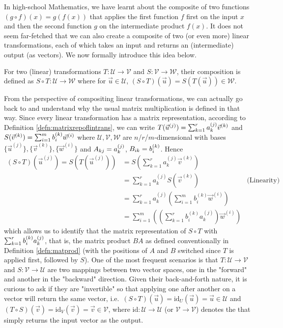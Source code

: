 In high-school Mathematics, we have learnt about the composite of two functions $(g \circ f)(x) = g(f(x))$ that applies the first function $f$ first on the input $x$ and then the second function $g$ on the intermediate product $f(x)$. It does not seem far-fetched that we can also create a composite of two (or even more) linear transformations, each of which takes an input and returns an (intermediate) output (as vectors). We now formally introduce this idea below.
\begin{defn}
For two (linear) transformations $T: \mathcal{U} \to \mathcal{V}$ and $S: \mathcal{V} \to \mathcal{W}$, their composition is defined as $S \circ T: \mathcal{U} \to \mathcal{W}$ where for $\vec{u} \in \mathcal{U}$, $(S \circ T)(\vec{u}) = S(T(\vec{u})) \in \mathcal{W}$.
\end{defn}
From the perspective of compositing linear transformations, we can actually go back to and understand why the usual matrix multiplication is defined in that way. Since every linear transformation has a matrix representation, according to Definition \ref{defn:matrixrepoflintrans}, we can write $T(\vec{u}^{(j)}) = \sum_{k=1}^{r} \smash{a_k^{(j)}}\vec{v}^{(k)}$ and $S(\vec{v}^{(k)}) = \sum_{i=1}^{m} \smash{b_i^{(k)}}\vec{w}^{(i)}$ where $\mathcal{U}, \mathcal{V}, \mathcal{W}$ are $n$/$r$/$m$-dimensional with bases $\{\vec{u}^{(j)}\}, \{\vec{v}^{(k)}\}, \{\vec{w}^{(i)}\}$ and $A_{kj} = \smash{a_k^{(j)}}$, $B_{ik} = \smash{b_i^{(k)}}$. Hence
\begin{align*}
(S \circ T)(\vec{u}^{(j)}) = S(T(\vec{u}^{(j)})) &= S(\sum_{k=1}^{r} a_k^{(j)}\vec{v}^{(k)}) \\
&= \sum_{k=1}^{r} a_k^{(j)}S(\vec{v}^{(k)}) & \text{(Linearity)} \\
&= \sum_{k=1}^{r} a_k^{(j)}(\sum_{i=1}^{m} b_i^{(k)}\vec{w}^{(i)}) \\
&= \sum_{i=1}^{m} \left((\sum_{k=1}^{r} b_i^{(k)} a_k^{(j)}) \vec{w}^{(i)}\right) 
\end{align*}
which allows us to identify that the matrix representation of $S \circ T$ with $\sum_{k=1}^{r} \smash{b_i^{(k)} a_k^{(j)}}$, that is, the matrix product $BA$ as defined conventionally in Definition \ref{defn:matprod} (with the positions of $A$ and $B$ switched since $T$ is applied first, followed by $S$). One of the most frequent scenarios is that $T: \mathcal{U} \to \mathcal{V}$ and $S: \mathcal{V} \to \mathcal{U}$ are two mappings between two vector spaces, one in the "forward" and another in the "backward" direction. Given their back-and-forth nature, it is curious to ask if they are "invertible" so that applying one after another on a vector will return the same vector, i.e.\ $(S \circ T)(\vec{u}) = \text{id}_{U}(\vec{u}) = \vec{u} \in \mathcal{U}$ and $(T \circ S)(\vec{v}) = \text{id}_{V}(\vec{v}) = \vec{v} \in \mathcal{V}$, where $\text{id}: \mathcal{U} \to \mathcal{U}$ (or $\mathcal{V} \to \mathcal{V}$) denotes the  that simply returns the input vector as the output.
